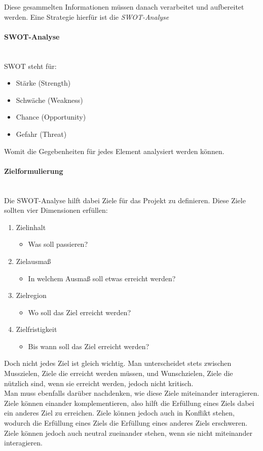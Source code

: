 \documentclass{article}
\newcommand{\paragraphlb}[1]{\paragraph{#1}\mbox{}\\}
\begin{document}
	Diese gesammelten Informationen müssen danach verarbeitet und aufbereitet werden. Eine Strategie hierfür ist die \textit{SWOT-Analyse}
	\paragraphlb{SWOT-Analyse}
	SWOT steht für:
	\begin{itemize}
		\item{Stärke (Strength)}
		\item{Schwäche (Weakness)}
		\item{Chance (Opportunity)}
		\item{Gefahr (Threat)}
	\end{itemize}
	Womit die Gegebenheiten für jedes Element analysiert werden können.
	\paragraphlb{Zielformulierung}
	Die SWOT-Analyse hilft dabei Ziele für das Projekt zu definieren. Diese Ziele sollten vier Dimensionen erfüllen:
	\begin{enumerate}
		\item{Zielinhalt}
		\begin{itemize}
			\item{Was soll passieren?}
		\end{itemize}
		\item{Zielausmaß}
		\begin{itemize}
			\item{In welchem Ausmaß soll etwas erreicht werden?}
		\end{itemize}
		\item{Zielregion}
		\begin{itemize}
			\item{Wo soll das Ziel erreicht werden?}
		\end{itemize}
		\item{Zielfristigkeit}
		\begin{itemize}
			\item{Bis wann soll das Ziel erreicht werden?}
		\end{itemize}
	\end{enumerate}
	Doch nicht jedes Ziel ist gleich wichtig. Man unterscheidet stets zwischen Musszielen, Ziele die erreicht werden müssen, und Wunschzielen, Ziele die nützlich sind, wenn sie erreicht werden, jedoch nicht kritisch. \\
	Man muss ebenfalls darüber nachdenken, wie diese Ziele miteinander interagieren. Ziele können einander komplementieren, also hilft die Erfüllung eines Ziels dabei ein anderes Ziel zu erreichen. Ziele können jedoch auch in Konflikt stehen, wodurch die Erfüllung eines Ziels die Erfüllung eines anderes Ziels erschweren. Ziele können jedoch auch neutral zueinander stehen, wenn sie nicht miteinander interagieren.
\end{document}
